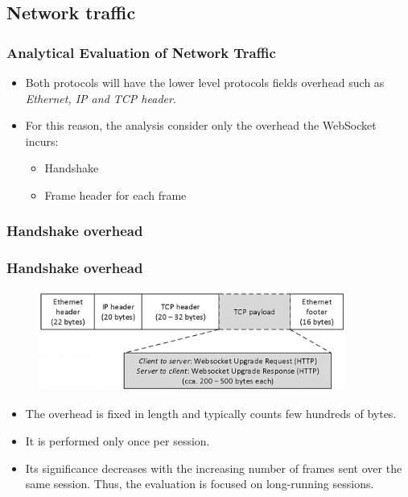 \documentclass{beamer}
\begin{document}
\subsection{Network traffic}
\begin{frame}
    \frametitle{Analytical Evaluation of Network Traffic}
    \begin{itemize}[<+->]
        \item Both protocols will have the lower level protocols fields overhead such as
              \textit{Ethernet, IP and TCP header}.
        \item For this reason, the analysis consider only the overhead the WebSocket incurs:
              \begin{itemize}[<+->]
                  \item Handshake
                  \item Frame header for each frame
              \end{itemize}
    \end{itemize}
\end{frame}

\subsubsection{Handshake overhead}
\begin{frame}
    \frametitle{Handshake overhead}
    \begin{figure}
        \includegraphics[width=0.9\textwidth]{images/websocket_handshake_overhead.jpeg}
    \end{figure}
    \pause{}
    \begin{itemize}[<+->]
        \item The overhead is \alert{fixed in length} and typically counts few hundreds of
              bytes.
        \item It is \alert{performed only once} per session.
        \item Its \alert{significance decreases} with the increasing number of frames sent
              over the same session. Thus, the evaluation is focused on long-running
              sessions.
    \end{itemize}
\end{frame}
\end{document}

